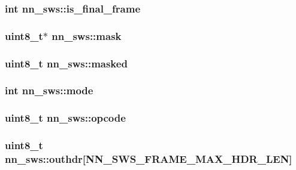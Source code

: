 \subsubsection[{is\+\_\+final\+\_\+frame}]{\setlength{\rightskip}{0pt plus 5cm}int nn\+\_\+sws\+::is\+\_\+final\+\_\+frame}\hypertarget{structnn__sws_a0d827b4645506bccdab293b894e2afd7}{}\label{structnn__sws_a0d827b4645506bccdab293b894e2afd7}
\subsubsection[{mask}]{\setlength{\rightskip}{0pt plus 5cm}uint8\+\_\+t$\ast$ nn\+\_\+sws\+::mask}\hypertarget{structnn__sws_ae9606f6f98dbabbe0ab905b78cf4b3dc}{}\label{structnn__sws_ae9606f6f98dbabbe0ab905b78cf4b3dc}
\subsubsection[{masked}]{\setlength{\rightskip}{0pt plus 5cm}uint8\+\_\+t nn\+\_\+sws\+::masked}\hypertarget{structnn__sws_a878c0c3510f1d0540e8ed0fd456defa4}{}\label{structnn__sws_a878c0c3510f1d0540e8ed0fd456defa4}
\subsubsection[{mode}]{\setlength{\rightskip}{0pt plus 5cm}int nn\+\_\+sws\+::mode}\hypertarget{structnn__sws_a88b0e0d57fcf681ef53be2ca49f2a341}{}\label{structnn__sws_a88b0e0d57fcf681ef53be2ca49f2a341}
\subsubsection[{opcode}]{\setlength{\rightskip}{0pt plus 5cm}uint8\+\_\+t nn\+\_\+sws\+::opcode}\hypertarget{structnn__sws_ada6f7afdf041c89256866209929c7016}{}\label{structnn__sws_ada6f7afdf041c89256866209929c7016}
\subsubsection[{outhdr}]{\setlength{\rightskip}{0pt plus 5cm}uint8\+\_\+t nn\+\_\+sws\+::outhdr\mbox{[}{\bf N\+N\+\_\+\+S\+W\+S\+\_\+\+F\+R\+A\+M\+E\+\_\+\+M\+A\+X\+\_\+\+H\+D\+R\+\_\+\+L\+EN}\mbox{]}}\hypertarget{structnn__sws_a223cc6cb203657b92932e646ea7c100a}{}\label{structnn__sws_a223cc6cb203657b92932e646ea7c100a}
